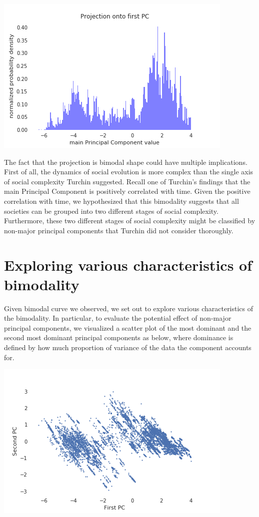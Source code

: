 \documentclass[11pt]{article}
\begin{document}
\begin{center}
	\includegraphics[scale=0.55]{first_PC.png}
\end{center}

The fact that the projection is bimodal shape could have multiple implications. First of all, the dynamics of social evolution is more complex than the single axis of social complexity Turchin suggested. Recall one of Turchin's findings that the main Principal Component is positively correlated with time. Given the positive correlation with time, we hypothesized that this bimodality suggests that all societies can be grouped into two different stages of social complexity. Furthermore, these two different stages of social complexity might be classified by non-major principal components that Turchin did not consider thoroughly. 

\section{Exploring various characteristics of bimodality}
Given bimodal curve we observed, we set out to explore various characteristics of the bimodality. In particular, to evaluate the potential effect of non-major principal components, we visualized a scatter plot of the most dominant and the second most dominant principal components as below, where dominance is defined by how much proportion of variance of the data the component accounts for. 

\begin{center}
	\includegraphics[scale=0.55]{two_PC.png}
\end{center}
\end{document}
